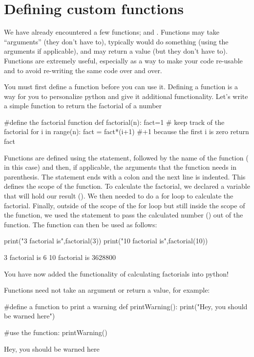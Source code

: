 \section{Defining custom functions}
We have already encountered a few functions;  and . Functions may take ``arguments'' (they don't have to), typically would do something (using the arguments if applicable), and may return a value (but they don't have to). Functions are extremely useful, especially as a way to make your code re-usable and to avoid re-writing the same code over and over. 

You must first define a function before you can use it. Defining a function is a way for you to personalize python and give it additional functionality. Let's write a simple function to return the factorial of a number
\begin{python}[caption = Defining a custom function]
#define the factorial function
def factorial(n):
    fact=1 # keep track of the factorial
    for i in range(n):
        fact = fact*(i+1) #+1 because the first i is zero
    return fact
\end{python}
Functions are defined using the  statement, followed by the name of the function ( in this case) and then, if applicable, the arguments that the function needs in parenthesis. The statement ends with a colon and the next line is indented. This defines the scope of the function. To calculate the factorial, we declared a variable that will hold our result (). We then needed to do a for loop to calculate the factorial. Finally, outside of the scope of the for loop but still inside the scope of the function, we used the  statement to pass the calculated number () out of the function. The function can then be used as follows:
\begin{python}[caption = Using a custom function]
print("3 factorial is",factorial(3))
print("10 factorial is",factorial(10))
\end{python}
\begin{poutput}
3 factorial is 6
10 factorial is 3628800
\end{poutput}
You have now added the functionality of calculating factorials into python!

Functions need not take an argument or return a value, for example:
\begin{python}[caption = Functions with no return values]
#define a function to print a warning
def printWarning():
  print("Hey, you should be warned here")

#use the function:
printWarning()
\end{python}
\begin{poutput}
Hey, you should be warned here
\end{poutput}

